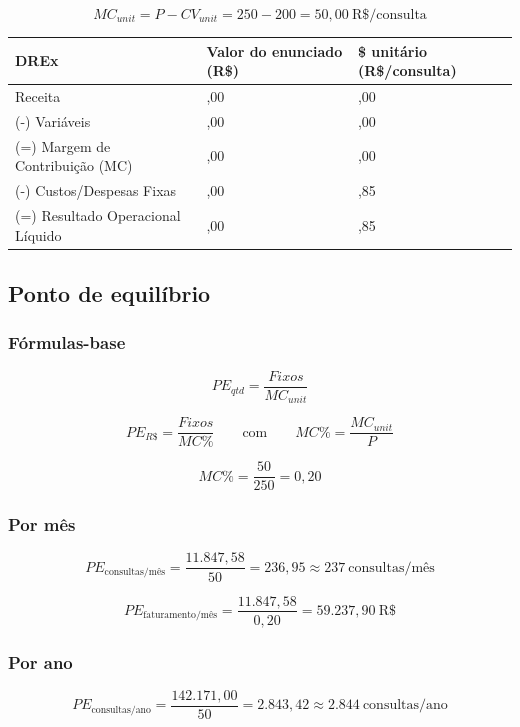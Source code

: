 \documentclass[12pt]{article}
\begin{document}
\[
MC_{unit} = P - CV_{unit} = 250 - 200 = 50{,}00\ \text{R\$/consulta}
\]

\begin{table}[htbp]
\centering
\scriptsize
\setlength{\tabcolsep}{3pt}
\renewcommand{\arraystretch}{1.15}
\begin{tabularx}{\textwidth}{%
>{\raggedright\arraybackslash}X
>{\raggedleft\arraybackslash}m{}
>{\raggedleft\arraybackslash}m{}}
\toprule
DREx & Valor do enunciado (R\$) & \$ unitário (R\$/consulta) \\
\midrule
Receita & 660.000,00 & 250,00 \\
(-) Variáveis & 528.000,00 & 200,00 \\
(=) Margem de Contribuição (MC) & 132.000,00 & 50,00 \\
(-) Custos/Despesas Fixas & 142.171,00 & 53,85 \\
(=) Resultado Operacional Líquido & -10.171,00 & -3,85 \\
\bottomrule
\end{tabularx}
\normalsize
\end{table}

\subsection{Ponto de equilíbrio}
\label{sec:org65a3f0d}

\subsubsection{Fórmulas-base}
\label{sec:org00e873f}
\[
PE_{qtd} = \frac{Fixos}{MC_{unit}}
\]

\[
PE_{R\$} = \frac{Fixos}{MC\%}
\qquad \text{com} \qquad
MC\% = \frac{MC_{unit}}{P}
\]

\[
MC\% = \frac{50}{250} = 0{,}20
\]

\subsubsection{Por mês}
\label{sec:orge34f9ef}
\[
PE_{\text{consultas/mês}} = \frac{11.847{,}58}{50} = 236{,}95 \approx 237\ \text{consultas/mês}
\]

\[
PE_{\text{faturamento/mês}} = \frac{11.847{,}58}{0{,}20} = 59.237{,}90\ \text{R\$}
\]

\subsubsection{Por ano}
\label{sec:orged63b64}
\[
PE_{\text{consultas/ano}} = \frac{142.171{,}00}{50} = 2.843{,}42 \approx 2.844\ \text{consultas/ano}
\]
\end{document}

